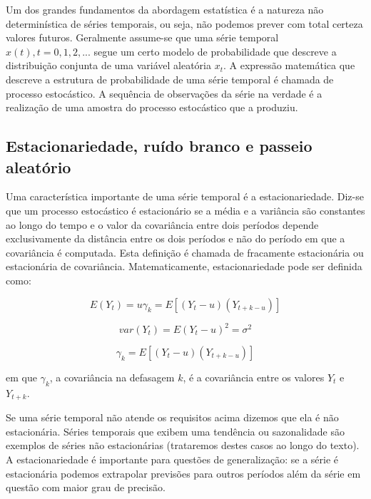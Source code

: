 \documentclass[twocolumn]{rbef}
\newcommand{\1}{\mathbbm{1}}
\begin{document}
Um dos grandes fundamentos da abordagem estatística é a natureza não determinística de séries temporais, ou seja, não podemos prever com total certeza valores futuros. Geralmente assume-se que uma série temporal ${x(t),t=0,1,2,...}$ segue um certo modelo de probabilidade que descreve a distribuição conjunta de uma variável aleatória $x_{t}$. A expressão matemática que descreve a estrutura de probabilidade de uma série temporal é chamada de processo estocástico. A sequência de observações da série na verdade é a realização de uma amostra do processo estocástico que a produziu.

\subsection{Estacionariedade, ruído branco e passeio aleatório} \label{stationary}

Uma característica importante de uma série temporal é a estacionariedade. Diz-se que um processo estocástico é estacionário se a média e a variância são constantes ao longo do tempo e o valor da covariância entre dois períodos depende exclusivamente da distância entre os dois períodos e não do período em que a covariância é computada. Esta definição é chamada de fracamente estacionária ou estacionária de covariância. Matematicamente, estacionariedade pode ser definida como:

\begin{equation}
E(Y_{t}) = u 
\gamma_{k} = E[(Y_{t} - u) (Y_{t+k - u})]
\end{equation}

\begin{equation}
var(Y_t) = E(Y_{t} - u)^2 = \sigma^{2} 
\end{equation}

\begin{equation}
\gamma_{k} = E[(Y_{t} - u) (Y_{t+k - u})]
\end{equation}

em que $\gamma_{k}$, a covariância na defasagem $k$, é a covariância entre os valores $Y_{t}$ e $Y_{t+k}$.

Se uma série temporal não atende os requisitos acima dizemos que ela é não estacionária. Séries temporais que exibem uma tendência ou sazonalidade são exemplos de séries não estacionárias (trataremos destes casos ao longo do texto). A estacionariedade é importante para questões de generalização: se a série é estacionária podemos extrapolar previsões para outros períodos além da série em questão com maior grau de precisão.
\end{document}
